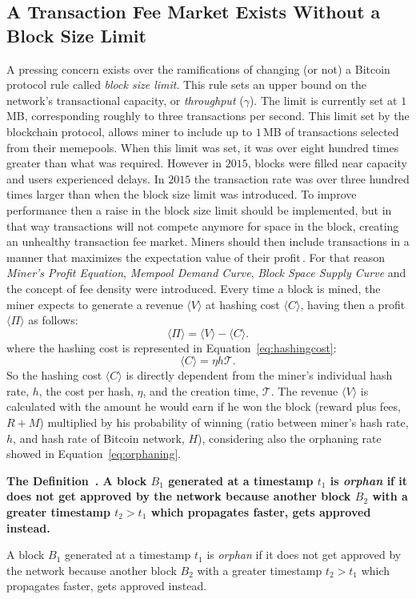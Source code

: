 \documentclass[USenglish]{uit-thesis}
\newcommand{\definition}[1]{%
  \refstepcounter{definition}%
  \par\noindent\textbf{The Definition~\thedefinition. #1}%
  \addcontentsline{def}{definition}
    {\protect\numberline{\thechapter.\thedefinition}#1}\par%
}
\begin{document}
\subsection{A Transaction Fee Market Exists Without a Block Size Limit}
A pressing concern exists over
the ramifications of changing (or not)
a Bitcoin protocol rule called
\emph{block size limit}. This rule sets an
upper bound on the network's
transactional capacity, or \emph{throughput} ($\gamma$).
The limit is currently set at $1$\,MB,
corresponding roughly to three transactions
per second. This limit set by the
blockchain protocol, allows miner
to include up to $1$\,MB of
transactions selected from
their memepools. When this limit
was set, it was over eight hundred times
greater than what was required.
However in $2015$, blocks
were filled near capacity and users
experienced delays. In $2015$
the transaction rate was over
three hundred times larger
than when the block size limit was introduced.
To improve performance then a raise in
the block size limit should be implemented,
but in that way transactions will not
compete anymore for space in the block,
creating an unhealthy transaction fee
market. Miners should then include
transactions in a manner that maximizes the
expectation value of their profit\,\cite{Rizun:2015:blocksizelimit}.
For that reason \emph{Miner's Profit Equation},
\emph{Mempool Demand Curve}, \emph{Block
Space Supply Curve} and the concept of
fee density were introduced.
Every time a block is mined, the miner expects to
generate a revenue $\langle V \rangle$
at hashing cost $\langle C \rangle$, having then
a profit $\langle \Pi \rangle$ as follows:
\begin{equation}
\label{eq:minerprofit}
\langle \Pi \rangle = \langle V\rangle - \langle C\rangle.
\end{equation}
where the hashing cost is represented in Equation~\ref{eq:hashingcost}:
\begin{equation}
\label{eq:hashingcost}
\langle C\rangle = \eta h\mathcal{T}.
\end{equation}
So the hashing cost $\langle C\rangle$ is
directly dependent from the miner's individual hash rate, $h$,
the cost per hash, $\eta$, and the creation time, $\mathcal{T}$.
The revenue $\langle V\rangle$
is calculated with the amount he would earn if he won
the block (reward plus fees, $R + M$) multiplied by his probability of
winning (ratio between miner's hash rate, $h$, and
hash rate of Bitcoin network, $H$), considering also the orphaning
rate showed in Equation~\ref{eq:orphaning}.
\definition{A block $B_1$ generated at a timestamp $t_1$
	is \emph{orphan} if it does not
	get approved by the network because another block $B_2$ with
a greater timestamp $t_2 > t_1$ which propagates faster, gets approved instead.}
\end{document}
